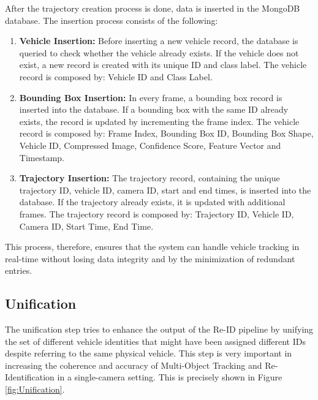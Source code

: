 After the trajectory creation process is done, data is inserted in the MongoDB database. The insertion process consists of the following:

\begin{enumerate}
    \item \textbf{Vehicle Insertion:} Before inserting a new vehicle record, the database is queried to check whether the vehicle already exists. If the vehicle does not exist, a new record is created with its unique ID and class label. The vehicle record is composed by: Vehicle ID and Class Label.
    
    \item \textbf{Bounding Box Insertion:} In every frame, a bounding box record is inserted into the database. If a bounding box with the same ID already exists, the record is updated by incrementing the frame index. The vehicle record is composed by: Frame Index, Bounding Box ID, Bounding Box Shape, Vehicle ID, Compressed Image, Confidence Score, Feature Vector and Timestamp.
    
    \item \textbf{Trajectory Insertion:} The trajectory record, containing the unique trajectory ID, vehicle ID, camera ID, start and end times, is inserted into the database. If the trajectory already exists, it is updated with additional frames. The trajectory record is composed by: Trajectory ID, Vehicle ID, Camera ID, Start Time, End Time.
\end{enumerate}
    
This process, therefore, ensures that the system can handle vehicle tracking in real-time without losing data integrity and by the minimization of redundant entries.

\subsection{Unification}
\label{subsec:Unification}

The unification step tries to enhance the output of the Re-ID pipeline by unifying the set of different vehicle identities that might have been assigned different IDs despite referring to the same physical vehicle. This step is very important in increasing the coherence and accuracy of Multi-Object Tracking and Re-Identification in a single-camera setting. This is precisely shown in Figure \ref{fig:Unification}.

